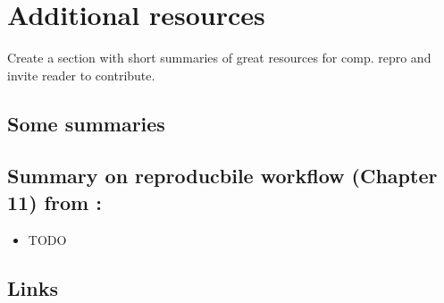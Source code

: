 \documentclass[]{book}
\providecommand{\tightlist}{%
  \setlength{\itemsep}{0pt}\setlength{\parskip}{0pt}}
\begin{document}
\hypertarget{additional-resources}{%
\section{Additional resources}\label{additional-resources}}

Create a section with short summaries of great resources for comp. repro and invite reader to contribute.

\hypertarget{some-summaries}{%
\subsection{Some summaries}\label{some-summaries}}

\hypertarget{summary-on-reproducbile-workflow-chapter-11-from-christensen2019transparent}{%
\subsection{\texorpdfstring{Summary on reproducbile workflow (Chapter 11) from \citet{christensen2019transparent}:}{Summary on reproducbile workflow (Chapter 11) from @christensen2019transparent:}}\label{summary-on-reproducbile-workflow-chapter-11-from-christensen2019transparent}}

\begin{itemize}
\tightlist
\item
  TODO
\end{itemize}

\hypertarget{links}{%
\subsection{Links}\label{links}}
\end{document}
